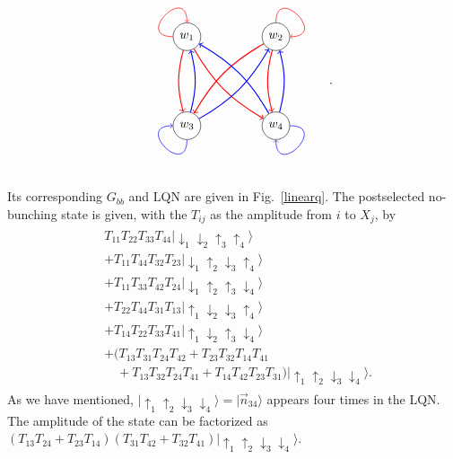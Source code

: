 \documentclass[a4paper,twocolumn,8pt,accepted=2021-12-15]{quantumarticle}
\def\>{\rangle}
\begin{document}
	\[\begin{tikzpicture}[baseline={([yshift=-.5ex]current bounding box.center)}]
		\node[circle,draw] (1) at (0,2.5) {$w_1 $};
		\node[circle,draw] (2) at (2.5,2.5) {$w_2 $};
		\node[circle,draw] (3) at (2.5,0) {$w_4$};
		\node[circle,draw] (4) at (0,0) {$w_3$};
		\path[every loop/.style={min distance=10mm,in=90,out=180,looseness=5,},line width = 0.5pt,->,color=red] (1) edge [loop above] (1);
		\path[every loop/.style={min distance=10mm,in=0,out=90,looseness=5},line width = 0.5pt,->,color=red] (2) edge [loop above]   (2);
		\path[every loop/.style={min distance=10mm,in=-90,out=0,looseness=5,color=blue},line width = 0.5pt,->] (3) edge [loop above]  (3);	
		\path[every loop/.style={min distance=10mm,in=-180,out=-90,looseness=5,color=blue},line width = 0.5pt,->] (4) edge [loop above]  (4);		
		
		\path[line width = 0.8pt,->,color=red] (1) edge[bend right=15]  node[near start] {$ $ } (3);
		\path[line width = 0.8pt,->,color=red] (1) edge[bend right=15]  node[near start] {$ $ } (4);
		
		
		\path[line width = 0.8pt,->,color=red] (2) edge[bend right=15]  node[near start] {$ $ } (3);
		\path[line width = 0.8pt,->,color=red] (2) edge[bend right=15]  node[near start] {$ $ } (4);
		\path[line width = 0.8pt,color=blue,->] (3) edge[bend right=15]  node[near start] {$ $ } (2); 
		\path[line width = 0.8pt,color=blue,->] (3) edge[bend right=15]  node[near start] {$ $ } (1);	
		
		\path[line width = 0.8pt,color=blue,->] (4) edge[bend right=15]  node[near start] {$ $ } (1); 
		\path[line width = 0.8pt,color=blue,->] (4) edge[bend right=15]  node[near start] {$ $ } (2);	
		
	\end{tikzpicture}.\]
	Its corresponding $G_{bb}$ and LQN are given in Fig.~\ref{linearq}.
	The postselected no-bunching state is given, with the  $T_{ij}$  as the amplitude from $i$ to $X_j$, by
	\begin{align}
		\begin{split}
			&T_{11}T_{22}T_{33}T_{44}|\downarrow_1\downarrow_2\uparrow_3\uparrow_4\> \\
			&+ T_{11}T_{44}T_{32}T_{23}|\downarrow_1\uparrow_2\downarrow_3\uparrow_4\> \\
			&+ T_{11}T_{33}T_{42}T_{24}|\downarrow_1\uparrow_2\uparrow_3\downarrow_4\>  \\
			& + T_{22}T_{44}T_{31}T_{13}|\uparrow_1\downarrow_2\downarrow_3\uparrow_4 \> \\
			&+ T_{14}T_{22}T_{33}T_{41}|\uparrow_1\downarrow_2\uparrow_3\downarrow_4 \>  \\
			&  +(T_{13}T_{31}T_{24}T_{42} +T_{23}T_{32}T_{14}T_{41} \\
			& \quad + T_{13}T_{32}T_{24}T_{41} + T_{14}T_{42}T_{23}T_{31})|\uparrow_1\uparrow_2\downarrow_3\downarrow_4\>.
		\end{split}
	\end{align} As we have mentioned, $|\uparrow_1\uparrow_2\downarrow_3\downarrow_4\> = |\vec{n}_{34}\>$ appears four times in the LQN. The amplitude of the state can be factorized as $(T_{13}T_{24}+T_{23}T_{14})(T_{31}T_{42} + T_{32}T_{41})|\uparrow_1\uparrow_2\downarrow_3\downarrow_4\>$.
	
\end{document}
